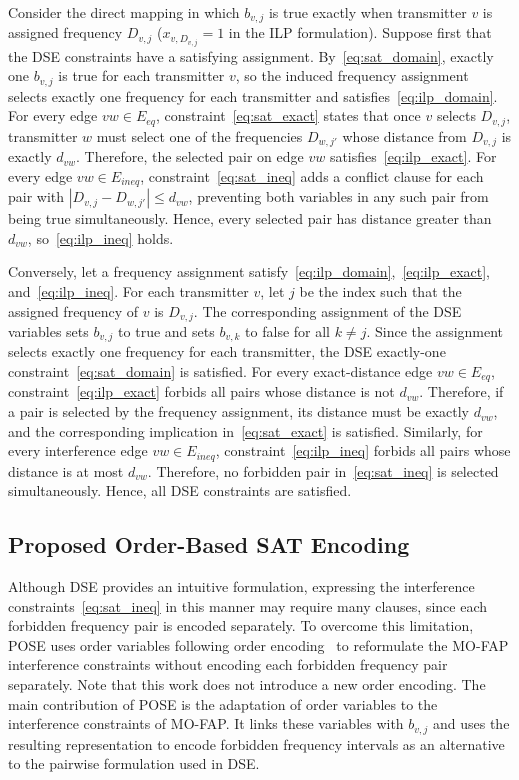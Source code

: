 \begin{IEEEproof}
Consider the direct mapping in which $b_{v,j}$ is true exactly when transmitter $v$ is assigned frequency $D_{v,j}$ ($x_{v,D_{v,j}}=1$ in the ILP formulation).
Suppose first that the DSE constraints have a satisfying assignment. By~\eqref{eq:sat_domain}, exactly one $b_{v,j}$ is true for each transmitter $v$, so the induced frequency assignment selects exactly one frequency for each transmitter and satisfies~\eqref{eq:ilp_domain}. For every edge $vw\in E_{eq}$, constraint~\eqref{eq:sat_exact} states that once $v$ selects $D_{v,j}$, transmitter $w$ must select one of the frequencies $D_{w,j'}$ whose distance from $D_{v,j}$ is exactly $d_{vw}$. Therefore, the selected pair on edge $vw$ satisfies~\eqref{eq:ilp_exact}. For every edge $vw\in E_{ineq}$, constraint~\eqref{eq:sat_ineq} adds a conflict clause for each pair with $|D_{v,j}-D_{w,j'}|\le d_{vw}$, preventing both variables in any such pair from being true simultaneously. Hence, every selected pair has distance greater than $d_{vw}$, so~\eqref{eq:ilp_ineq} holds.

Conversely, let a frequency assignment satisfy~\eqref{eq:ilp_domain},~\eqref{eq:ilp_exact}, and~\eqref{eq:ilp_ineq}. 
For each transmitter $v$, let $j$ be the index such that the assigned frequency of $v$ is $D_{v,j}$.
The corresponding assignment of the DSE variables sets $b_{v,j}$ to true and sets $b_{v,k}$ to false for all $k\neq j$.
Since the assignment selects exactly one frequency for each transmitter, the DSE exactly-one constraint~\eqref{eq:sat_domain} is satisfied.
For every exact-distance edge $vw\in E_{eq}$, constraint~\eqref{eq:ilp_exact} forbids all pairs whose distance is not $d_{vw}$. Therefore, if a pair is selected by the frequency assignment, its distance must be exactly $d_{vw}$, and the corresponding implication in~\eqref{eq:sat_exact} is satisfied.
Similarly, for every interference edge $vw\in E_{ineq}$, constraint~\eqref{eq:ilp_ineq} forbids all pairs whose distance is at most $d_{vw}$. Therefore, no forbidden pair in~\eqref{eq:sat_ineq} is selected simultaneously. Hence, all DSE constraints are satisfied.
\end{IEEEproof}
\subsection{Proposed Order-Based SAT Encoding}
\label{subsec:order_encoding}
Although DSE provides an intuitive formulation, expressing the interference constraints~\eqref{eq:sat_ineq} in this manner may require many clauses, since each forbidden frequency pair is encoded separately.
To overcome this limitation, POSE uses order variables following order encoding~\cite{Crawford1994Scheduling,Tamura2009OrderEncoding,Petke2011Order_encoding,Abio2014LinearSAT} to reformulate the MO-FAP interference constraints without encoding each forbidden frequency pair separately.
Note that this work does not introduce a new order encoding.
The main contribution of POSE is the adaptation of order variables to the interference constraints of MO-FAP. It links these variables with $b_{v,j}$ and uses the resulting representation to encode forbidden frequency intervals as an alternative to the pairwise formulation used in DSE.

